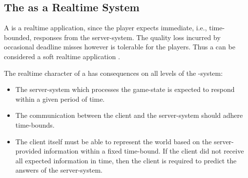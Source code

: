 \documentclass[a4paper, 10pt]{book}
\begin{document}

\subsection{The \MMORG as a Realtime System}
\label{sec:soft-realtime}

A \MMORG is a realtime application, since the player expects immediate,
i.e., time-bounded, responses from the server-system. 
The quality loss incurred by
occasional deadline misses however is tolerable for the players. Thus a
\MMORG can be considered a soft realtime application \cite{kopetz97}.

The realtime character of a \MMORG has consequences
on all levels of the \MMORG-system: 
\begin{itemize}
    \item The server-system which processes
        the game-state is expected to respond within a given period of time.
    \item The communication between the client and the server-system should
        adhere time-bounds.
    \item The client itself must be able to represent
        the world based on the server-provided information within a fixed
        time-bound. If the client did not receive all expected information in
        time, then the client is required to predict the answers of the
        server-system.
\end{itemize}
\end{document}
